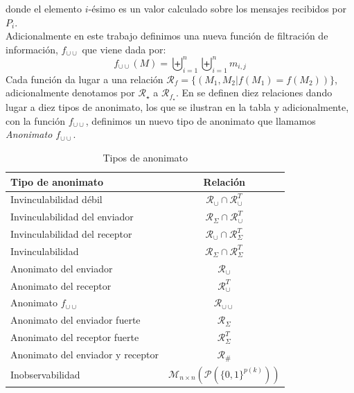 donde el elemento $i$-ésimo es un valor calculado sobre los mensajes recibidos por $P_i$.\\
Adicionalmente en este trabajo definimos una nueva función de filtración de información,
$f_{\cup\cup}$ que viene dada por:
$$f_{\cup\cup}(M) = \biguplus_{i=1}^n \biguplus_{i=1}^n m_{i,j}$$
Cada función da lugar a una relación
$\mathcal{R}_f = \{(M_1, M_2 | f(M_1)=f(M_2))\}$, adicionalmente denotamos por
$\mathcal{R}_\star$ a $\mathcal{R}_{f_\star}$.
En \cite{conf/pet/HeviaM08} se definen diez relaciones dando lugar a diez tipos de anonimato, los
que se ilustran en la tabla y adicionalmente, con la función $f_{\cup\cup}$, definimos un nuevo
tipo de anonimato que llamamos \textit{Anonimato $f_{\cup\cup}$}.
\begin{table}
\begin{center}
\begin{tabular}{|l|c|}
\hline
Tipo de anonimato & Relación \\
\hline
\hline
Invinculabilidad débil & $\mathcal{R}_\cup \cap \mathcal{R}_\cup^T$ \\
\hline
Invinculabilidad del enviador & $\mathcal{R}_\Sigma \cap \mathcal{R}_\cup^T$ \\
\hline
Invinculabilidad del receptor & $\mathcal{R}_\cup \cap \mathcal{R}_\Sigma^T$ \\
\hline
Invinculabilidad & $\mathcal{R}_\Sigma \cap \mathcal{R}_\Sigma^T$ \\
\hline
Anonimato del enviador & $\mathcal{R}_\cup$ \\
\hline
Anonimato del receptor & $\mathcal{R}_\cup^T$ \\
\hline
Anonimato $f_{\cup\cup}$ & $\mathcal{R}_{\cup\cup}$\\
\hline
Anonimato del enviador fuerte & $\mathcal{R}_\Sigma$ \\
\hline
Anonimato del receptor fuerte & $\mathcal{R}_\Sigma^T$ \\
\hline
Anonimato del enviador y receptor & $\mathcal{R}_\#$ \\
\hline
Inobservabilidad & $\mathcal{M}_{n \times n}(\mathcal{P}(\{0, 1\}^{p(k)}))$ \\
\hline
\end{tabular}
\end{center}
\caption{Tipos de anonimato}
\label{tabla_anon}
\end{table}

